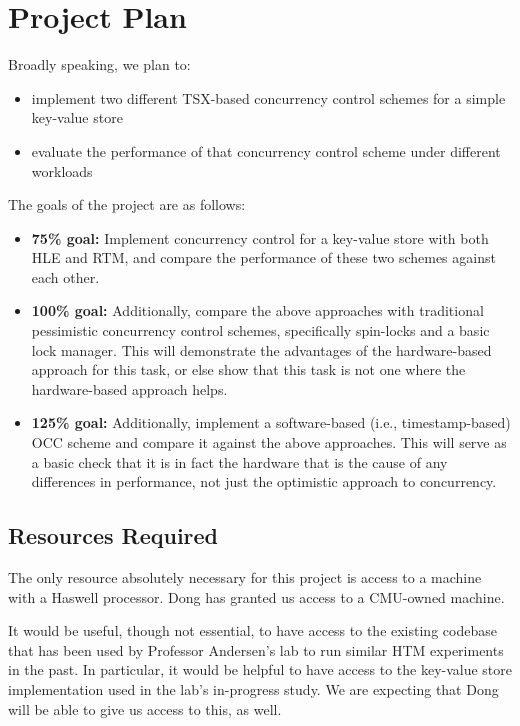 \section{Project Plan} \label{sec:intro}

Broadly speaking, we plan to:
\begin{itemize}
\item implement two different TSX-based concurrency control schemes for a simple key-value store
\item evaluate the performance of that concurrency control scheme under different workloads
\end{itemize}
The goals of the project are as follows:
\begin{itemize}
\item \textbf{75\% goal:} Implement concurrency control for a key-value store with both HLE and RTM, and compare the performance of these two schemes against each other.
\item \textbf{100\% goal:} Additionally, compare the above approaches with traditional pessimistic concurrency control schemes, specifically spin-locks and a basic lock manager. This will demonstrate the advantages of the hardware-based approach for this task, or else show that this task is not one where the hardware-based approach helps.
\item \textbf{125\% goal:} Additionally, implement a software-based (i.e., timestamp-based) OCC scheme and compare it against the above approaches. This will serve as a basic check that it is in fact the hardware that is the cause of any differences in performance, not just the optimistic approach to concurrency.
\end{itemize}

\subsection{Resources Required}
The only resource absolutely necessary for this project is access to a machine with a Haswell processor. Dong has granted us access to a CMU-owned machine.

It would be useful, though not essential, to have access to the existing codebase that has been used by Professor Andersen's lab to run similar HTM experiments in the past. In particular, it would be helpful to have access to the key-value store implementation used in the lab's in-progress study. We are expecting that Dong will be able to give us access to this, as well.

